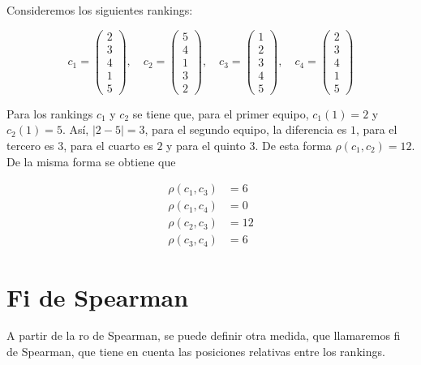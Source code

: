 \begin{ejemplo}
Consideremos los siguientes rankings:

\begin{equation*}
c_1 = \left( \begin{array}{c}
2\\
3\\
4\\
1\\
5
\end{array} \right), \quad
c_2 = \left( \begin{array}{c}
5\\
4\\
1\\
3\\
2
\end{array} \right), \quad
c_3 = \left( \begin{array}{c}
1\\
2\\
3\\
4\\
5
\end{array} \right), \quad
c_4 = \left( \begin{array}{c}
2\\
3\\
4\\
1\\
5
\end{array} \right)
\end{equation*}

Para los rankings $c_1$ y $c_2$ se tiene que, para el primer equipo, $c_1(1) = 2$ y $c_2(1) = 5$. Así, $|2-5| = 3$, para el segundo equipo, la diferencia es $1$, para el tercero es $3$, para el cuarto es $2$ y para el quinto $3$. De esta forma $\rho(c_1, c_2) = 12$. De la misma forma se obtiene que 

\begin{align*}
\rho(c_1, c_3) & = 6\\
\rho(c_1, c_4) & = 0\\
\rho(c_2, c_3) & = 12\\
\rho(c_3, c_4) & = 6
\end{align*}  
\end{ejemplo}

\section{Fi de Spearman}

A partir de la ro de Spearman, se puede definir otra medida, que llamaremos fi de Spearman, que tiene en cuenta las posiciones relativas entre los rankings.

